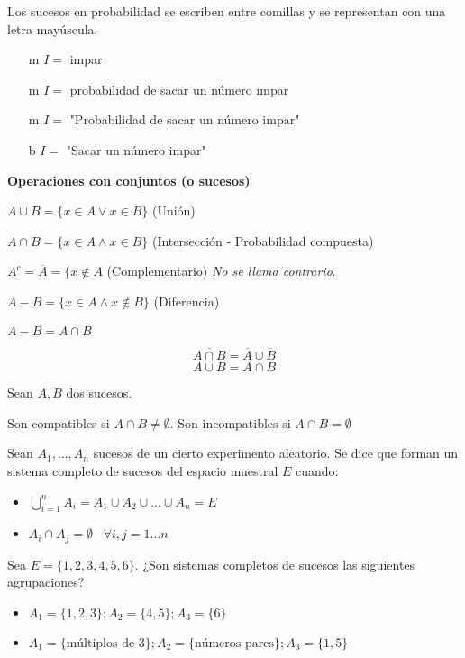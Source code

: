 
Los sucesos en probabilidad se escriben entre comillas y se representan con una letra mayúscula.

\begin{itemize}
    \item[m] $I =$ impar
    \item[m] $I =$ probabilidad de sacar un número impar
    \item[m] $I =$ "Probabilidad de sacar un número impar"
    \item[b] $I =$ "Sacar un número impar"
\end{itemize}

\textbf{Operaciones con conjuntos (o sucesos)}

$A\cup B = \{x\in A \vee x \in B\}$ (Unión)

$A\cap B = \{x\in A \wedge x \in B\}$ (Intersección - Probabilidad compuesta)

$A^c = \overline{A} = \{x\not\in A$ (Complementario) \textit{No se llama contrario}.

$A - B = \{x\in A \wedge x \not\in B\}$ (Diferencia)

\obs $A - B = A \cap \overline{B}$

\begin{defn}
\[\overline{A\cap B} = \overline{A}\cup \overline{B}\]
\[\overline{A\cup B} = \overline{A}\cap \overline{B}\]
\end{defn}



\begin{defn}[Compatibilidad]
Sean $A,B$ dos sucesos.

Son compatibles si $A\cap B \not= \emptyset$. 
Son incompatibles si $A\cap B =\emptyset$
\end{defn}

\begin{defn}
Sean $A_1,...,A_n$ sucesos de un cierto experimento aleatorio.
%
Se dice que forman un sistema completo de sucesos del espacio muestral $E$ cuando:

\begin{itemize}
    \item $\displaystyle\bigcup_{i=1}^n A_i = A_1\cup A_2 \cup ... \cup A_n =  E$
    \item $A_i\cap A_j = \emptyset\;\;\; \forall i,j=1...n$
\end{itemize}
\end{defn}

\begin{example}
Sea $E = \{1,2,3,4,5,6\}$. ¿Son sistemas completos de sucesos las siguientes agrupaciones?

\begin{itemize}
    \item $A_1 = \{1,2,3\}; A_2 = \{4,5\} ; A_3 = \{6\}$
    \item $A_1 = \{\text{múltiplos de 3}\} ; A_2 = \{\text{números pares}\} ; A_3 = \{1,5\}$
\end{itemize}
\end{example}


